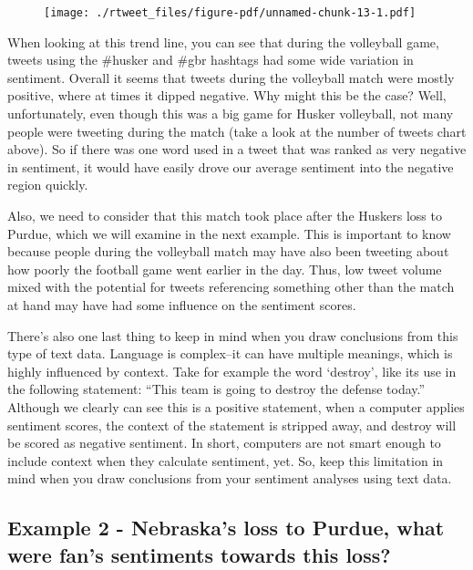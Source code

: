 \documentclass[
  letterpaper,
  DIV=11,
  numbers=noendperiod]{scrreprt}
\begin{document}
\begin{figure}[H]

{\centering \texttt{[image: ./rtweet\_files/figure-pdf/unnamed-chunk-13-1.pdf]}

}

\end{figure}

When looking at this trend line, you can see that during the volleyball
game, tweets using the \#husker and \#gbr hashtags had some wide
variation in sentiment. Overall it seems that tweets during the
volleyball match were mostly positive, where at times it dipped
negative. Why might this be the case? Well, unfortunately, even though
this was a big game for Husker volleyball, not many people were tweeting
during the match (take a look at the number of tweets chart above). So
if there was one word used in a tweet that was ranked as very negative
in sentiment, it would have easily drove our average sentiment into the
negative region quickly.

Also, we need to consider that this match took place after the Huskers
loss to Purdue, which we will examine in the next example. This is
important to know because people during the volleyball match may have
also been tweeting about how poorly the football game went earlier in
the day. Thus, low tweet volume mixed with the potential for tweets
referencing something other than the match at hand may have had some
influence on the sentiment scores.

There's also one last thing to keep in mind when you draw conclusions
from this type of text data. Language is complex--it can have multiple
meanings, which is highly influenced by context. Take for example the
word `destroy', like its use in the following statement: ``This team is
going to destroy the defense today.'' Although we clearly can see this
is a positive statement, when a computer applies sentiment scores, the
context of the statement is stripped away, and destroy will be scored as
negative sentiment. In short, computers are not smart enough to include
context when they calculate sentiment, yet. So, keep this limitation in
mind when you draw conclusions from your sentiment analyses using text
data.

\hypertarget{example-2---nebraskas-loss-to-purdue-what-were-fans-sentiments-towards-this-loss}{%
\subsection{Example 2 - Nebraska's loss to Purdue, what were fan's
sentiments towards this
loss?}\label{example-2---nebraskas-loss-to-purdue-what-were-fans-sentiments-towards-this-loss}}
\end{document}
